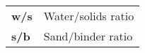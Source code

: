 \begin{longtable}{ll}
    \textbf{w/s} & Water/solids ratio\\
    \textbf{s/b} & Sand/binder ratio\\
\end{longtable}

